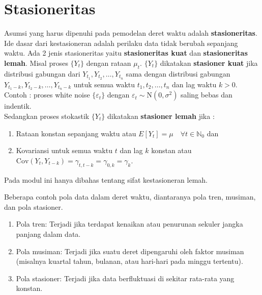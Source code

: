 \documentclass[
]{book}
\begin{document}
\hypertarget{stasioneritas}{%
\section{Stasioneritas}\label{stasioneritas}}

Asumsi yang harus dipenuhi pada pemodelan deret waktu adalah \textbf{stasioneritas}. Ide dasar dari kestasioneran adalah perilaku data tidak berubah sepanjang waktu. Ada 2 jenis stasioneritas yaitu \textbf{stasioneritas kuat} dan \textbf{stasioneritas lemah}. Misal proses \(\{Y_t\}\) dengan rataan \(\mu_t\). \(\{Y_t\}\) dikatakan \textbf{stasioner kuat} jika distribusi gabungan dari \(Y_{t_1},Y_{t_2},\dots,Y_{t_n}\) sama dengan distribusi gabungan \(Y_{t_1-k},Y_{t_2-k},\dots,Y_{t_n-k}\) untuk semua waktu \(t_1,t_2,\dots,t_n\) dan lag waktu \(k>0\). Contoh : proses white noise \(\{\varepsilon_t\}\) dengan \(\varepsilon_t \sim \text{N}(0, \sigma^2)\) saling bebas dan indentik.\\
Sedangkan proses stokastik \(\{Y_t \}\) dikatakan \textbf{stasioner lemah} jika :

\begin{enumerate}
\item Rataan konstan sepanjang waktu atau $E[Y_t] = \mu \quad \forall t \in \mathbb{N}_0$ dan 
\item Kovariansi untuk semua waktu $t$ dan lag $k$ konstan atau $\text{Cov}(Y_t,Y_{t-k}) = \gamma_{t,t-k} = \gamma_{0,k} = \gamma_k$. 
\end{enumerate}

Pada modul ini hanya dibahas tentang sifat kestasioneran lemah.

Beberapa contoh pola data dalam deret waktu, diantaranya pola tren, musiman, dan pola stasioner.

\begin{enumerate}
\item Pola tren: Terjadi jika terdapat kenaikan atau penurunan sekuler jangka panjang dalam data.
\item Pola musiman: Terjadi jika suatu deret dipengaruhi oleh faktor musiman (misalnya kuartal tahun, bulanan, atau hari-hari pada minggu tertentu).
\item Pola stasioner: Terjadi jika  data berfluktuasi di sekitar rata-rata yang konstan.
\end{enumerate}
\end{document}
